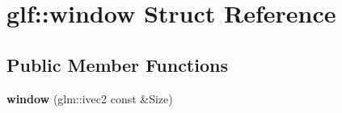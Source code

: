 \hypertarget{structglf_1_1window}{\section{glf\-:\-:window \-Struct \-Reference}
\label{structglf_1_1window}
}
\subsection*{\-Public \-Member \-Functions}
\begin{DoxyCompactItemize}
\item 
\hypertarget{structglf_1_1window_a4ed769f2c702a8a05c8333cb96c3f236}{{\bfseries window} (glm\-::ivec2 const \&\-Size)}\label{structglf_1_1window_a4ed769f2c702a8a05c8333cb96c3f236}

\end{DoxyCompactItemize}
